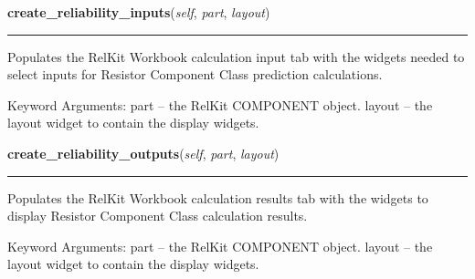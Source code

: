     \label{reliafree:resistors:resistor:Resistor:create_reliability_inputs}

    \vspace{0.5ex}

\hspace{.8\funcindent}\begin{boxedminipage}{\funcwidth}

    \raggedright \textbf{create\_reliability\_inputs}(\textit{self}, \textit{part}, \textit{layout})

    \vspace{-1.5ex}

    \rule{\textwidth}{0.5\fboxrule}
\setlength{\parskip}{2ex}
    Populates the RelKit Workbook calculation input tab with the widgets
    needed to select inputs for Resistor Component Class prediction 
    calculations.

    Keyword Arguments: part   -- the RelKit COMPONENT object. layout -- 
    the layout widget to contain the display widgets.

\setlength{\parskip}{1ex}
    \end{boxedminipage}

    \label{reliafree:resistors:resistor:Resistor:create_reliability_outputs}

    \vspace{0.5ex}

\hspace{.8\funcindent}\begin{boxedminipage}{\funcwidth}

    \raggedright \textbf{create\_reliability\_outputs}(\textit{self}, \textit{part}, \textit{layout})

    \vspace{-1.5ex}

    \rule{\textwidth}{0.5\fboxrule}
\setlength{\parskip}{2ex}
    Populates the RelKit Workbook calculation results tab with the 
    widgets to display Resistor Component Class calculation results.

    Keyword Arguments: part   -- the RelKit COMPONENT object. layout -- 
    the layout widget to contain the display widgets.

\setlength{\parskip}{1ex}
    \end{boxedminipage}


